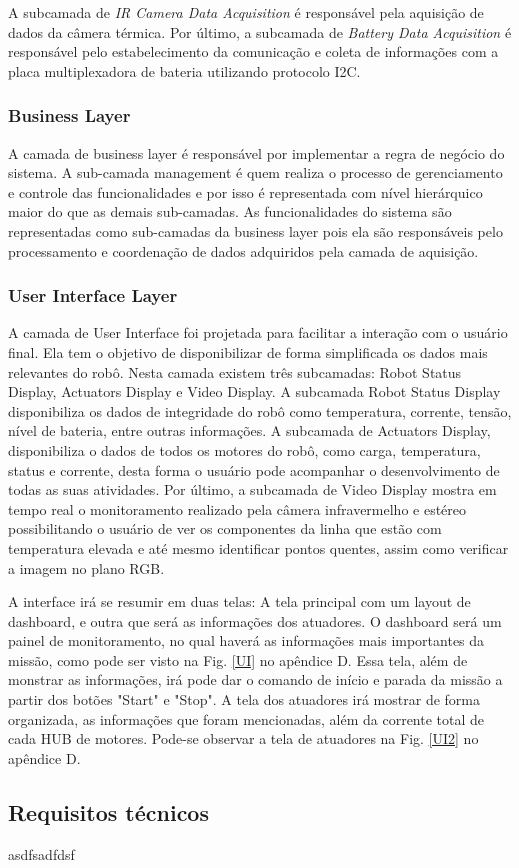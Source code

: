 A subcamada de \textit{IR Camera Data Acquisition} é responsável pela aquisição de dados da câmera térmica. 
Por último, a subcamada de \textit{Battery Data Acquisition} é responsável pelo estabelecimento da comunicação e coleta de informações com a placa multiplexadora de bateria utilizando protocolo I2C.

\subsubsection{Business Layer}

A camada de business layer é responsável por implementar a regra de negócio do sistema. A sub-camada management é quem realiza o processo de gerenciamento e controle das funcionalidades e por isso é representada com nível hierárquico maior do que as demais sub-camadas. As funcionalidades do sistema são representadas como sub-camadas da business layer pois ela são responsáveis pelo processamento e coordenação de dados adquiridos pela camada de aquisição. 


\subsubsection{User Interface Layer}

A camada de User Interface foi projetada para facilitar a interação com o usuário final. Ela tem o objetivo de disponibilizar de forma simplificada os dados mais relevantes do robô. Nesta camada existem três subcamadas: Robot Status Display, Actuators Display e Video Display. A subcamada Robot Status Display disponibiliza os dados de integridade do robô como temperatura, corrente, tensão, nível de bateria, entre outras informações. A subcamada de Actuators Display, disponibiliza o dados de todos os motores do robô, como carga, temperatura, status e corrente, desta forma o usuário pode acompanhar o desenvolvimento de todas as suas atividades. Por último, a subcamada de Video Display mostra em tempo real o monitoramento realizado pela câmera infravermelho e estéreo possibilitando o usuário de ver os componentes da linha que estão com temperatura elevada e até mesmo identificar pontos quentes, assim como verificar a imagem no plano RGB.

A interface irá se resumir em duas telas: A tela principal com um layout de dashboard, e outra que será as informações dos atuadores. O dashboard será um painel de monitoramento, no qual haverá as informações mais importantes da missão, como pode ser visto na Fig. \ref{UI} no apêndice D. Essa tela, além de monstrar as informações, irá pode dar o comando de início e parada da missão a partir dos botões "Start" e "Stop". A tela dos atuadores irá mostrar de forma organizada, as informações que foram mencionadas, além da corrente total de cada HUB de motores. Pode-se observar a tela de atuadores na Fig. \ref{UI2} no apêndice D.

\label{ssec:arqs}


\subsection{Requisitos técnicos}
\label{ssec:reqt}
asdfsadfdsf

